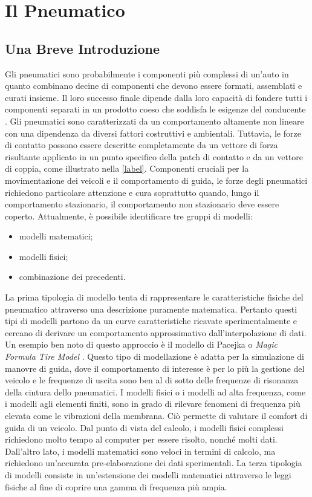 \chapter{Il Pneumatico}
\label{Pneumatico}
%
\section{Una Breve Introduzione}
Gli pneumatici sono probabilmente i componenti più complessi di un'auto in quanto combinano decine di componenti che devono essere formati, assemblati e curati insieme. Il loro successo finale dipende dalla loro capacità di fondere tutti i componenti separati in un prodotto coeso che soddisfa le esigenze del conducente \cite{rill}. Gli pneumatici sono caratterizzati da un comportamento altamente non lineare con una dipendenza da diversi fattori costruttivi e ambientali. Tuttavia, le forze di contatto possono essere descritte completamente da un vettore di forza risultante applicato in un punto specifico della patch di contatto e da un vettore di coppia, come illustrato nella \figurename\ref{label}.
%
%
Componenti cruciali per la movimentazione dei veicoli e il comportamento di guida, le forze degli pneumatici richiedono particolare attenzione e cura soprattutto quando, lungo il comportamento stazionario, il comportamento non stazionario deve essere coperto. Attualmente, è possibile identificare tre gruppi di modelli:
%
\begin{itemize}
	\item modelli matematici;
	\item modelli fisici;
	\item combinazione dei precedenti.
\end{itemize}
%
La prima tipologia di modello tenta di rappresentare le caratteristiche fisiche del pneumatico attraverso una descrizione puramente matematica. Pertanto questi tipi di modelli partono da un curve caratteristiche ricavate sperimentalmente e cercano di derivare un comportamento approssimativo dall'interpolazione di dati. Un esempio ben noto di questo approccio è il modello di Pacejka o \textit{Magic Formula Tire Model} \cite{hans}. Questo tipo di modellazione è adatta per la simulazione di manovre di guida, dove il comportamento di interesse è per lo più la gestione del veicolo e le frequenze di uscita sono ben al di sotto delle frequenze di risonanza della cintura dello pneumatici. I modelli fisici o i modelli ad alta frequenza, come i modelli agli elementi finiti, sono in grado di rilevare fenomeni di frequenza più elevata come le vibrazioni della membrana. Ciò permette di valutare il comfort di guida di un veicolo. Dal punto di vista del calcolo, i modelli fisici complessi richiedono molto tempo al computer per essere risolto, nonché molti dati. Dall'altro lato, i modelli matematici sono veloci in termini di calcolo, ma richiedono un'accurata pre-elaborazione dei dati sperimentali. La terza tipologia di modelli consiste in un'estensione dei modelli matematici attraverso le leggi fisiche al fine di coprire una gamma di frequenza più ampia.\\
